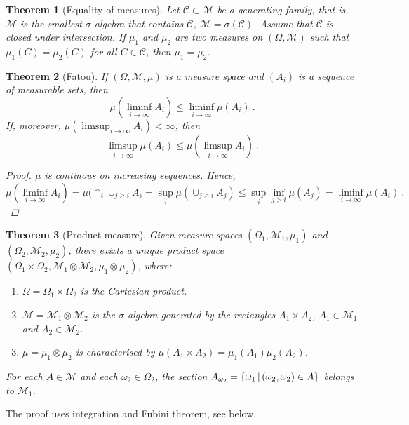 \documentclass[12pt,a4paper]{amsart}
\theoremstyle{plain}%
\newtheorem{theorem}{Theorem}%
\theoremstyle{definition}
\theoremstyle{remark}
\begin{document}
\begin{theorem}[Equality of measures] Let $\mathcal C \subset \mathcal M$ be a
  generating family, that is, $\mathcal M$ is the smallest
  $\sigma$-algebra that contains $\mathcal C$, $\mathcal M =
  \sigma(\mathcal C)$. Assume that $\mathcal C$ is closed under
  intersection. If $\mu_1$ and $\mu_2$ are two measures on
  $(\Omega,\mathcal M)$ such that $\mu_1(C) = \mu_2(C)$ for all $C \in
  \mathcal C$, then $\mu_1 = \mu_2$. 
\end{theorem}

\begin{theorem}[Fatou]
If $(\Omega,\mathcal M,\mu)$ is a measure space and $(A_i)$ is a
sequence of measurable sets, then
\begin{equation*}
  \mu(\liminf_{i\to\infty} A_i) \leq \liminf_{i\to\infty} \mu(A_i) \ .
\end{equation*}
If, moreover, $\mu(\limsup_{i\to\infty} A_i) < \infty$, then
\begin{equation*}
  \limsup_{i\to\infty} \mu(A_i) \leq \mu(\limsup_{i\to\infty} A_i) \ .
\end{equation*}
\begin{proof}
$\mu$ is continous on increasing sequences. Hence,
  \begin{equation*}
\mu(\liminf_{i\to\infty} A_i) = \mu(\cap_i \cup_{j\ge i} A_) = \sup_i
\mu(\cup_{j \geq i} A_j) \leq \sup_i \inf_{j > i} \mu(A_j) =
\liminf_{i\to\infty} \mu(A_i) \ .   
  \end{equation*}
\end{proof}
\end{theorem}
\begin{theorem}[Product measure] Given measure spaces
  $(\Omega_1,\mathcal M_1,\mu_1)$ and $(\Omega_2,\mathcal M_2,\mu_2)$,
  there exixts a unique \emph{product space} $(\Omega_1 \times
  \Omega_2, \mathcal M_1 \otimes \mathcal M_2, \mu_1 \otimes \mu_2)$, where:
  \begin{enumerate}
  \item $\Omega = \Omega_1 \times \Omega _2$ is the Cartesian product.
  \item $\mathcal M = \mathcal M_1 \otimes \mathcal M_2$ is the
    $\sigma$-algebra generated by the rectangles $A_1 \times A_2$,
    $A_1 \in \mathcal M_1$ and $A_2 \in \mathcal M_2$. 
  \item $\mu = \mu_1 \otimes \mu_2$ is characterised by $\mu(A_1
    \times A_2) = \mu_1(A_1) \mu_2(A_2)$.
  \end{enumerate}
For each $A \in \mathcal M$ and each $\omega_2 \in \Omega_2$, the
section $A_{\omega_2} = \left\{\omega_1 \, \middle| \, (\omega_2,\omega_2) \in A \right\}$
belongs to $\mathcal M_1$.
\end{theorem}
The proof uses integration and Fubini theorem, see below.
\end{document}

